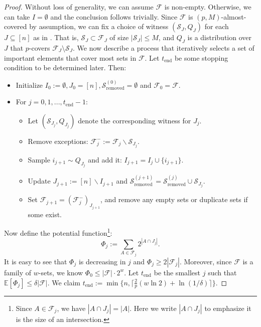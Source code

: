 \documentclass{article}
\newcommand{\<}{\langle}
\renewcommand{\>}{\rangle}
\newcommand{\calF}{\mathcal{F}}
\newcommand{\calS}{\mathcal{S}}
\newcommand{\E}{\mathbb{E}}
\begin{document}
\begin{proof}
    Without loss of generality, we can assume $\calF$ is non-empty. Otherwise, we can take $I = \emptyset$ and the conclusion follows trivially. Since $\calF$ is $(p, M)$-almost-covered by assumption, we can fix a choice of witness $(\calS_J, Q_J)$ for each $J \subseteq [n]$ as in . That is, $\calS_J \subset \calF_J$ of size $|\calS_J|\le M$, and $Q_J$ is a distribution over $J$ that $p$-covers $\calF_J \setminus \calS_J$. We now describe a process that iteratively selects a set of important elements that cover most sets in $\calF$. Let $t_{\text{end}}$ be some stopping condition to be determined later. Then:
    \begin{itemize}
        \item Initialize $I_0 := \emptyset, J_0 = [n], \calS_{\text{removed}}^{(0)} = \emptyset$ and $\calF_0 = \calF$.
        \item For $j = 0,1,...,t_{\text{end}}-1$:
        \begin{itemize}
            \item Let $(\calS_{J_j}, Q_{J_j})$ denote the corresponding witness for $J_j$.
            \item Remove exceptions: $\calF_{j}^{-} := \calF_j \backslash \calS_{J_j}.$ 
            \item Sample $i_{j+1} \sim Q_{J_j}$ and add it: $I_{j+1} = I_j \cup \{i_{j+1}\}$. 
            \item Update $J_{j+1}:= [n] \backslash I_{j+1}$ and $\calS_{\text{removed}}^{(j+1)} = \calS_{\text{removed}}^{(j)} \cup \calS_{J_j}$. 
            \item Set $\calF_{j+1} = (\calF_{j}^-)_{J_{j+1}}
            $, and remove any empty sets or duplicate sets if some exist.
        \end{itemize}
    \end{itemize} 
    Now define the potential function\footnote{Since $A \in \calF_j$, we have $|A \cap J_j| = |A|$. Here we write $|A \cap J_j|$ to emphasize it is the size of an intersection.}: 
    \[
    \Phi_j := \sum_{A \in \calF_j}2^{|A \cap J_j|}.
    \]
    It is easy to see that $\Phi_j$ is decreasing in $j$ and $\Phi_j \geq 2 |\calF_j|$. Moreover, since $\calF$ is a family of $w$-sets, we know $\Phi_0 \leq |\calF| \cdot 2^w$. Let $t_{\text{end}}$ be the smallest $j$ such that $\E [\Phi_j] \leq \delta |\calF|$. We claim $t_{\text{end}}:= \min \{n, \lceil \frac{2}{p}(w \ln 2) + \ln (1/\delta) \rceil\}$.


\end{proof}
\end{document}
